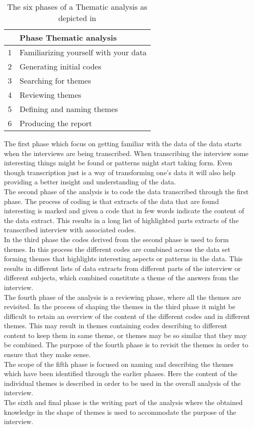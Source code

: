 \begin{table}[H]
\centering
\begin{tabular}[width=\textwidth]{cl}
\hline
& Phase Thematic analysis \\ \hline
1 & Familiarizing yourself with your data \\
2 & Generating initial codes \\
3 & Searching for themes \\
4 & Reviewing themes \\
5 & Defining and naming themes\\
6 & Producing the report \\ \hline
\end{tabular}
\caption{The six phases of a Thematic analysis as depicted in \parencite[87]{PDF:Braun2006}}
\label{ThematicPhases}
\end{table}

The first phase which focus on getting familiar with the data of the data starts when the interviews are being transcribed. When transcribing the interview some interesting things might be found or patterns might start taking form. Even though transcription just is a way of transforming one's data it will also help providing a better insight and understanding of the data.\\
The second phase of the analysis is to code the data transcribed through the first phase. The process of coding is that extracts of the data that are found interesting is marked and given a code that in few words indicate the content of the data extract. This results in a long list of highlighted parts extracts of the transcribed interview with associated codes. \\
In the third phase the codes derived from the second phase is used to form themes. In this process the different codes are combined across the data set forming themes that highlights interesting aspects or patterns in the data. This results in different lists of data extracts from different parts of the interview or different subjects, which combined constitute a theme of the answers from the interview.\\
The fourth phase of the analysis is a reviewing phase, where all the themes are revisited. In the process of shaping the themes in the third phase it might be difficult to retain an overview of the content of the different codes and in different themes. This may result in themes containing codes describing to different content to keep them in same theme, or themes may be so similar that they may be combined. The purpose of the fourth phase is to revisit the themes in order to ensure that they make sense. \\
The scope of the fifth phase is focused on naming and describing the themes which have been identified through the earlier phases. Here the content of the individual themes is described in order to be used in the overall analysis of the interview.\\
The sixth and final phase is the writing part of the analysis where the obtained knowledge in the shape of themes is used to accommodate the purpose of the interview.\\



